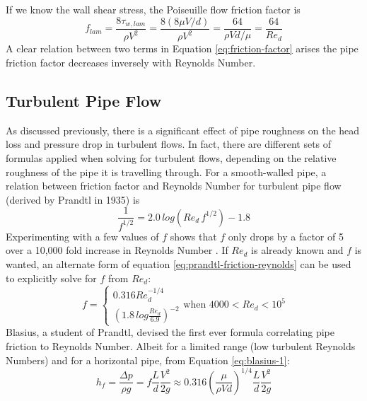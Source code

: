 \documentclass[10pt]{article} %
\numberwithin{equation}{section} %
\begin{document}
\begin{multicols}{2}
If we know the wall shear stress, the Poiseuille flow friction factor is
\begin{equation} \label{eq:friction-factor}
f_{lam} = \frac{8 \tau_{w, lam}}{\rho V^{2}} = \frac{8(8 \mu V/d)}{\rho V^{2}} = \frac{64}{\rho V d/\mu} = \frac{64}{Re_{d}}
\end{equation}	
A clear relation between two terms in Equation \ref{eq:friction-factor} arises \textemdash{} the pipe friction factor decreases inversely with Reynolds Number.
\subsection{Turbulent Pipe Flow}

As discussed previously, there is a significant effect of pipe roughness on the head loss and pressure drop in turbulent flows. In fact, there are different sets of formulas applied when solving for turbulent flows, depending on the relative roughness of the pipe it is travelling through. For a smooth-walled pipe, a relation between friction factor and Reynolds Number for turbulent pipe flow (derived by Prandtl in 1935) is \cite{fluid-mechanics}
\begin{equation} \label{eq:prandtl-friction-reynolds}
\frac{1}{f^{1/2}} = 2.0\, log({Re_{d}\, f^{1/2}}) - 1.8
\end{equation}
Experimenting with a few values of $f$ shows that $f$ only drops by a factor of 5 over a 10,000 fold increase in Reynolds Number \cite{fluid-mechanics}. If $Re_{d}$ is already known and $f$ is wanted, an alternate form of equation \ref{eq:prandtl-friction-reynolds} can be used to explicitly solve for $f$ from $Re_{d}$:
\begin{equation} \label{eq:blasius-1}
f = 
\begin{cases}
0.316 Re_{d}^{-1/4}\\%
\left( 1.8\, log \frac{Re_{d}}{6.9} \right)^{-2}%
\end{cases}
\text{when } 4000 < Re_{d} < 10^{5}
\end{equation}
Blasius, a student of Prandtl, devised the first ever formula correlating pipe friction to Reynolds Number. Albeit for a limited range (low turbulent Reynolds Numbers) and for a horizontal pipe, from Equation \ref{eq:blasius-1}:
\begin{equation} \label{eq:blasius-2}
h_{f} = \frac{\Delta p}{\rho g} = f \frac{L}{d} \frac{V^{2}}{2g} \approx 0.316 \left( \frac{\mu}{\rho V d} \right)^{1/4} \frac{L}{d} \frac{V^{2}}{2g}

\end{equation}
\end{multicols}
\end{document}
